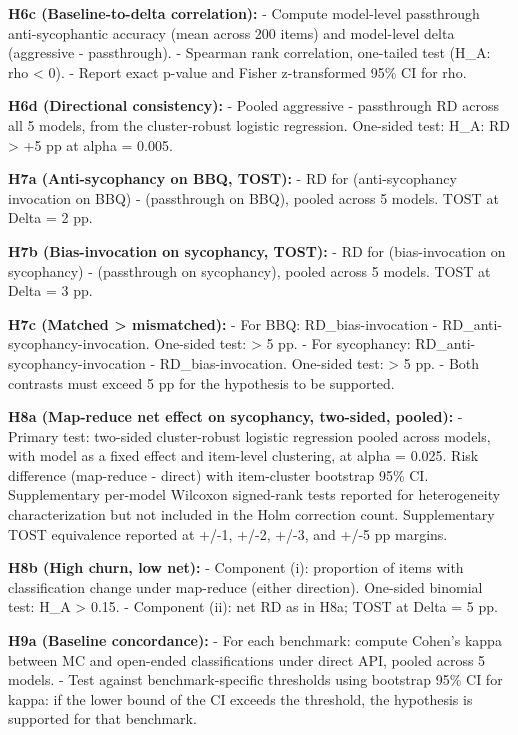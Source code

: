 \documentclass[
  11pt,
]{article}
\begin{document}
\textbf{H6c (Baseline-to-delta correlation):} - Compute model-level
passthrough anti-sycophantic accuracy (mean across 200 items) and
model-level delta (aggressive - passthrough). - Spearman rank
correlation, one-tailed test (H\_A: rho \textless{} 0). - Report exact
p-value and Fisher z-transformed 95\% CI for rho.

\textbf{H6d (Directional consistency):} - Pooled aggressive -
passthrough RD across all 5 models, from the cluster-robust logistic
regression. One-sided test: H\_A: RD \textgreater{} +5 pp at alpha =
0.005.

\textbf{H7a (Anti-sycophancy on BBQ, TOST):} - RD for (anti-sycophancy
invocation on BBQ) - (passthrough on BBQ), pooled across 5 models. TOST
at Delta = 2 pp.

\textbf{H7b (Bias-invocation on sycophancy, TOST):} - RD for
(bias-invocation on sycophancy) - (passthrough on sycophancy), pooled
across 5 models. TOST at Delta = 3 pp.

\textbf{H7c (Matched \textgreater{} mismatched):} - For BBQ:
\textbar RD\_bias-invocation\textbar{} -
\textbar RD\_anti-sycophancy-invocation\textbar. One-sided test:
\textgreater{} 5 pp. - For sycophancy:
\textbar RD\_anti-sycophancy-invocation\textbar{} -
\textbar RD\_bias-invocation\textbar. One-sided test: \textgreater{} 5
pp. - Both contrasts must exceed 5 pp for the hypothesis to be
supported.

\textbf{H8a (Map-reduce net effect on sycophancy, two-sided, pooled):} -
Primary test: two-sided cluster-robust logistic regression pooled across
models, with model as a fixed effect and item-level clustering, at alpha
= 0.025. Risk difference (map-reduce - direct) with item-cluster
bootstrap 95\% CI. Supplementary per-model Wilcoxon signed-rank tests
reported for heterogeneity characterization but not included in the Holm
correction count. Supplementary TOST equivalence reported at +/-1, +/-2,
+/-3, and +/-5 pp margins.

\textbf{H8b (High churn, low net):} - Component (i): proportion of items
with classification change under map-reduce (either direction).
One-sided binomial test: H\_A \textgreater{} 0.15. - Component (ii): net
RD as in H8a; TOST at Delta = 5 pp.

\textbf{H9a (Baseline concordance):} - For each benchmark: compute
Cohen's kappa between MC and open-ended classifications under direct
API, pooled across 5 models. - Test against benchmark-specific
thresholds using bootstrap 95\% CI for kappa: if the lower bound of the
CI exceeds the threshold, the hypothesis is supported for that
benchmark.
\end{document}
